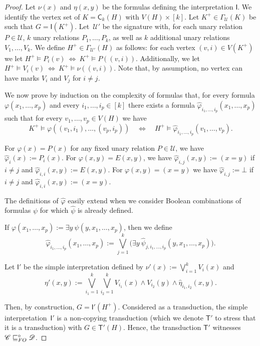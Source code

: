 \documentclass{lmcs}
\newcommand{\Cc}{\mathscr{C}}
\newcommand{\Dd}{\mathscr{D}}
\renewcommand{\phi}{\varphi}
\renewcommand{\FO}{{\rm FO}}
\theoremstyle{definition}
\begin{document}
\begin{proof}
	Let $\nu(x)$ and $\eta(x,y)$ be the formulas defining the interpretation $\mathsf I$. We identify the vertex set of $K=\mathsf C_k(H)$ with $V(H)\times [k]$.  Let $K^+\in\Gamma_{\mathcal U}(K)$ be such that $G=\mathsf I(K^+)$.
	Let~${\mathcal U}'$ be the signature with, for each  unary relation $P\in{\mathcal U}$, $k$ unary relations $P_1,\dots,P_k$, as well as $k$ additional unary relations $V_1,\dots,V_k$.
	We define $H^+\in\Gamma_{{\mathcal U}'}(H)$ as follows:
	for each vertex $(v,i)\in V(K^+)$ we let 
	$H^+\models P_i(v)\ \iff\ K^+\models P((v,i))$. 
	Additionally, we let
	$H^+\models V_i(v)\ \iff\ K^+\models \nu((v,i))$. Note that, by assumption, no vertex can have marks $V_i$ and $V_j$ for $i\neq j$.
	
	We now prove by induction on the complexity of formulas that, for every formula $\phi(x_1,\dots,x_p)$ and every $i_1,\dots,i_p\in [k]$ there exists a formula $\hat\phi_{i_1,\dots,i_p}(x_1,\dots,x_p)$ such that for every $v_1,\dots,v_p\in V(H)$ we have
	\begin{equation}
		\label{eq:trsp}
		K^+\models \phi((v_1,i_1),\dots,(v_p,i_p))\quad\iff\quad H^+\models\hat\phi_{i_1,\dots,i_p}(v_1,\dots,v_p).
	\end{equation}

	For $\phi(x)=P(x)$ for any fixed unary relation $P\in{\mathcal U}$, we have
	$\hat\phi_i(x):=P_i(x)$. For $\phi(x,y)=E(x,y)$, we have
	$\hat\phi_{i,j}(x,y):=(x=y)$ if $i\neq j$ and $\hat\phi_{i,i}(x,y):=E(x,y)$.
	For $\phi(x,y)=(x=y)$ we have $\hat\phi_{i,j}:=\bot$ if $i\neq j$ and 
	$\hat\phi_{i,i}(x,y):=(x=y)$.
	
	The definitions of $\hat\phi$ easily extend when we consider Boolean combinations of formulas $\psi$ for which $\hat\psi$ is already defined.
	
	If $\phi(x_1,\dots,x_p):=\exists y\ \psi(y,x_1,\dots,x_p)$, then we define
	\[\hat\phi_{i_1,\dots,i_p}(x_1,\dots,x_p):=\bigvee_{j=1}^k \bigl(\exists y\ 
	\hat\psi_{j,i_1,\dots,i_p}(y,x_1,\dots,x_p)\bigr).\]
	
	Let $\mathsf I'$ be the simple interpretation defined by $\nu'(x):=\bigvee_{i=1}^k V_i(x)$ and 
	\[
	\eta'(x,y):=\bigvee_{i_1=1}^k\bigvee_{i_2=1}^k V_{i_1}(x)\wedge V_{i_2}(y)\wedge\hat\eta_{i_1,i_2}(x,y).
	\]

	Then, by construction, $G=\mathsf I'(H^+)$.  Considered as a transduction, 
	the simple interpretation~$\mathsf I'$ is a non-copying transduction (which we  denote $\mathsf T'$ to stress that it is a transduction) with 
	$G\in\mathsf T'(H)$. Hence,
	the  transduction $\mathsf T'$ 	 witnesses $\Cc\sqsubseteq_\FO^\circ\Dd$.
\end{proof}
\end{document}
